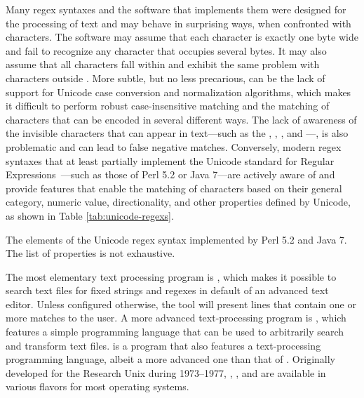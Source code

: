 Many regex syntaxes and the software that implements them were designed for the
processing of  text and may behave in surprising ways, when
confronted with  characters. The software may assume that each
character is exactly one byte wide and fail to recognize any character that
occupies several bytes. It may also assume that all  characters
fall within  and exhibit the same problem with characters outside
. More subtle, but no less precarious, can be the lack of support
for Unicode case conversion and normalization algorithms, which makes it
difficult to perform robust case-insensitive matching and the matching of
characters that can be encoded in several different ways. The lack of awareness
of the invisible characters that can appear in  text---such as the
, , , and ---, is also problematic
and can lead to false negative matches. Conversely, modern regex syntaxes that
at least partially implement the Unicode standard for Regular
Expressions~\cite{unicode13}---such as those of Perl 5.2 or Java 7---are
actively aware of  and provide features that enable the matching of
characters based on their general category, numeric value, directionality, and
other properties defined by Unicode, as shown in Table \ref{tab:unicode-regexs}.

\begin{table}[!tb]
  
  \caption{The elements of the Unicode regex syntax implemented by Perl 5.2
    and Java 7. The list of properties is not exhaustive.}
  \label{tab:unicode-regexs}
\end{table}

The most elementary text processing  program is %
, which makes it possible to search text files for fixed strings and regexes in
default of an advanced text editor. Unless configured otherwise, the tool will
present lines that contain one or more matches to the user. A more advanced
text-processing  program is , which features a
simple programming language that can be used to arbitrarily search and transform
text files.  is a  program that also features a
text-processing programming language, albeit a more advanced one than that of
. Originally developed for the Research Unix during 1973--1977,
, , and  are available in various
flavors for most operating systems.

